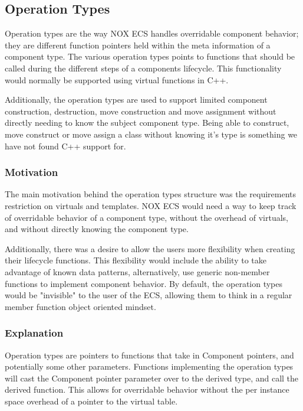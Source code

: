 \subsection{Operation Types}
\label{subsec:detailed_operation_types}
Operation types are the way NOX ECS handles overridable component behavior; they are different function pointers held within the meta information of a component type.
The various operation types points to functions that should be called during the different steps
of a components lifecycle.
This functionality would normally be supported using virtual functions in C++.

Additionally, the operation types are used to support limited component construction, destruction, move construction and move assignment without directly needing to know the subject component type.
Being able to construct, move construct or move assign a class without knowing it's type
is something we have not found C++ support for.

\subsubsection{Motivation}
The main motivation behind the operation types structure was the requirements restriction on virtuals
and templates.
NOX ECS would need a way to keep track of overridable behavior of a component type, without the overhead of virtuals,
and without directly knowing the component type.

Additionally, there was a desire to allow the users more flexibility when creating their lifecycle functions.
This flexibility would include the ability to take advantage of known data patterns,
alternatively, use generic non-member functions to implement component behavior.
By default, the operation types would be "invisible" to the user of the ECS, allowing them to think in a regular member function object oriented mindset.

\subsubsection{Explanation}
Operation types are pointers to functions that take in Component pointers,
and potentially some other parameters.
Functions implementing the operation types will cast the Component pointer parameter over to the derived type,
and call the derived function.
This allows for overridable behavior without the per instance space overhead of a pointer to the virtual table.

